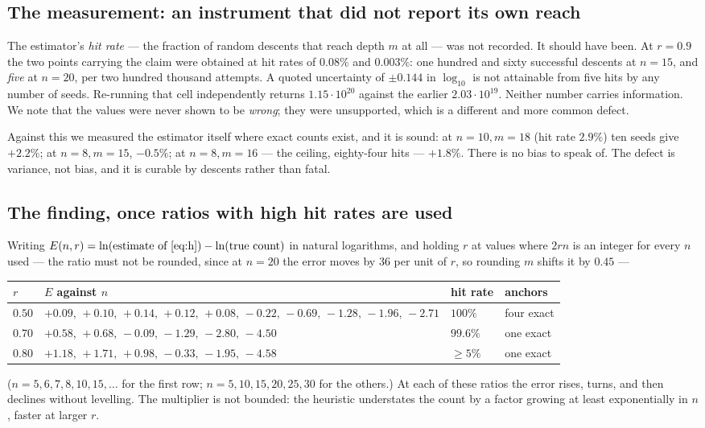 \documentclass[11pt,a4paper]{article}
\begin{document}
\subsection*{The measurement: an instrument that did not report its own reach}
The estimator's \emph{hit rate} --- the fraction of random descents that reach depth $m$ at all
--- was not recorded.  It should have been.  At $r=0.9$ the two points carrying the claim were
obtained at hit rates of $0.08\%$ and $0.003\%$: one hundred and sixty successful descents at
$n=15$, and \emph{five} at $n=20$, per two hundred thousand attempts.  A quoted uncertainty of
$\pm0.144$ in $\log_{10}$ is not attainable from five hits by any number of seeds.  Re-running
that cell independently returns $1.15\cdot10^{20}$ against the earlier $2.03\cdot10^{19}$.
Neither number carries information.  We note that the values were never shown to be
\emph{wrong}; they were unsupported, which is a different and more common defect.

Against this we measured the estimator itself where exact counts exist, and it is sound:
at $n{=}10,m{=}18$ (hit rate $2.9\%$) ten seeds give $+2.2\%$; at $n{=}8,m{=}15$, $-0.5\%$; at
$n{=}8,m{=}16$ --- the ceiling, eighty-four hits --- $+1.8\%$.  There is no bias to speak of.
The defect is variance, not bias, and it is curable by descents rather than fatal.

\subsection*{The finding, once ratios with high hit rates are used}
Writing $E(n,r)=\ln(\text{estimate of \eqref{eq:h}})-\ln(\text{true count})$ in natural
logarithms, and holding $r$ at values where $2rn$ is an integer for every $n$ used --- the ratio
must not be rounded, since at $n=20$ the error moves by $36$ per unit of $r$, so rounding $m$
shifts it by $0.45$ ---
\begin{center}
\begin{tabular}{llll}
\toprule
$r$ & $E$ against $n$ & hit rate & anchors\\
\midrule
$0.50$ & $+0.09,\,+0.10,\,+0.14,\,+0.12,\,+0.08,\,-0.22,\,-0.69,\,-1.28,\,-1.96,\,-2.71$ & $100\%$ & four exact\\
$0.70$ & $+0.58,\,+0.68,\,-0.09,\,-1.29,\,-2.80,\,-4.50$ & $99.6\%$ & one exact\\
$0.80$ & $+1.18,\,+1.71,\,+0.98,\,-0.33,\,-1.95,\,-4.58$ & $\ge5\%$ & one exact\\
\bottomrule
\end{tabular}
\end{center}
($n=5,6,7,8,10,15,\dots$ for the first row; $n=5,10,15,20,25,30$ for the others.)  At each of
these ratios the error rises, turns, and then declines without levelling.  The multiplier is not
bounded: the heuristic understates the count by a factor growing at least exponentially in $n$,
faster at larger $r$.
\end{document}
